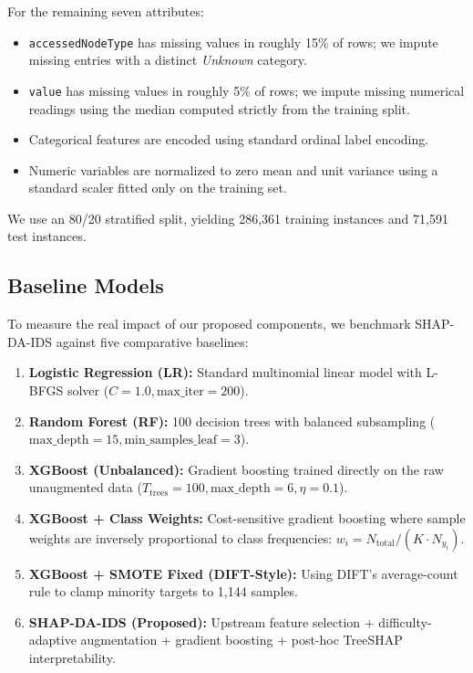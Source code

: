 For the remaining seven attributes:
\begin{itemize}
    \item \texttt{accessedNodeType} has missing values in roughly 15\% of rows; we impute missing entries with a distinct \textit{Unknown} category.
    \item \texttt{value} has missing values in roughly 5\% of rows; we impute missing numerical readings using the median computed strictly from the training split.
    \item Categorical features are encoded using standard ordinal label encoding.
    \item Numeric variables are normalized to zero mean and unit variance using a standard scaler fitted only on the training set.
\end{itemize}

We use an 80/20 stratified split, yielding 286,361 training instances and 71,591 test instances.

\subsection{Baseline Models}
To measure the real impact of our proposed components, we benchmark SHAP-DA-IDS against five comparative baselines:
\begin{enumerate}
    \item \textbf{Logistic Regression (LR):} Standard multinomial linear model with L-BFGS solver ($C=1.0, \text{max\_iter}=200$).
    \item \textbf{Random Forest (RF):} 100 decision trees with balanced subsampling ($\text{max\_depth}=15, \text{min\_samples\_leaf}=3$).
    \item \textbf{XGBoost (Unbalanced):} Gradient boosting trained directly on the raw unaugmented data ($T_{\text{trees}}=100, \text{max\_depth}=6, \eta=0.1$).
    \item \textbf{XGBoost + Class Weights:} Cost-sensitive gradient boosting where sample weights are inversely proportional to class frequencies: $w_i = N_{\text{total}} / (K \cdot N_{y_i})$.
    \item \textbf{XGBoost + SMOTE Fixed (DIFT-Style):} Using DIFT's average-count rule to clamp minority targets to 1,144 samples.
    \item \textbf{SHAP-DA-IDS (Proposed):} Upstream feature selection + difficulty-adaptive augmentation + gradient boosting + post-hoc TreeSHAP interpretability.
\end{enumerate}

